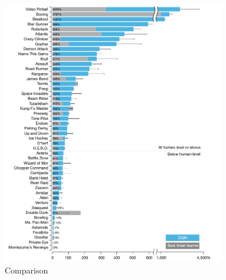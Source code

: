 \begin{figure}[h]
	\begin{center}
		\includegraphics[width=367px,height=435px]{src/img/state/comparision}
		\caption{Comparison\cite{nature}} \label{fig:comp}
    \end{center}
\end{figure}




